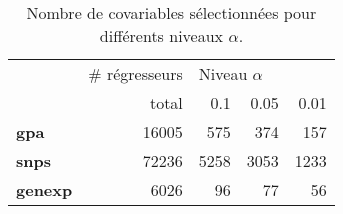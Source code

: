 \begin{table}[H]
\centering
\caption{Nombre de covariables sélectionnées pour différents niveaux $\alpha$.}
\label{tab:mul_test}
\begin{tabular}{lrrrr}
\toprule
{} & \# régresseurs & \multicolumn{3}{l}{Niveau $\alpha$} \\
{} &         total &             0.1 &  0.05 &  0.01 \\
\midrule
\textbf{gpa   } &         16005 &             575 &   374 &   157 \\
\textbf{snps  } &         72236 &            5258 &  3053 &  1233 \\
\textbf{genexp} &          6026 &              96 &    77 &    56 \\
\bottomrule
\end{tabular}
\end{table}
